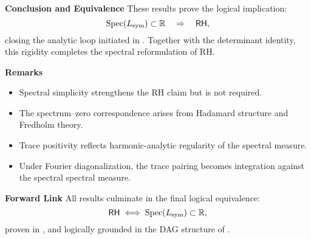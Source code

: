 \medskip

\textbf{Conclusion and Equivalence}
These results prove the logical implication:
\[
\operatorname{Spec}(L_{\mathrm{sym}}) \subset \mathbb{R} \quad \Rightarrow \quad \mathsf{RH},
\]
closing the analytic loop initiated in . Together with the determinant identity, this rigidity completes the spectral reformulation of RH.

\medskip

\textbf{Remarks}
\begin{itemize}
  \item Spectral simplicity strengthens the RH claim but is not required.
  \item The spectrum–zero correspondence arises from Hadamard structure and Fredholm theory.
  \item Trace positivity reflects harmonic-analytic regularity of the spectral measure.
  \item Under Fourier diagonalization, the trace pairing becomes integration against the spectral spectral measure.
\end{itemize}

\medskip

\textbf{Forward Link}
All results culminate in the final logical equivalence:
\[
\mathsf{RH} \iff \operatorname{Spec}(L_{\mathrm{sym}}) \subset \mathbb{R},
\]
proven in , and logically grounded in the DAG structure of .
